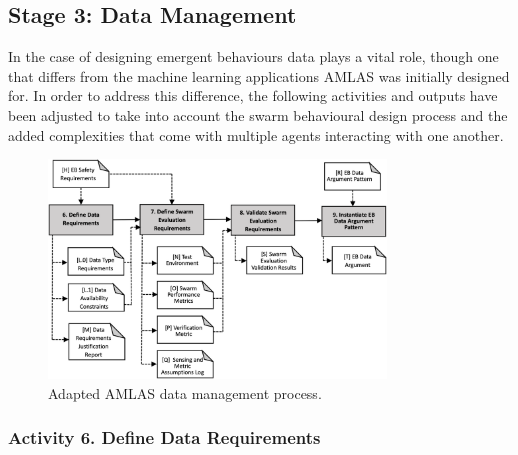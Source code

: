 \documentclass[lettersize,journal]{IEEEtran}
\begin{document}

\subsection{Stage 3: Data Management} \label{framework-stage3}

In the case of designing emergent behaviours data plays a vital role, though one that differs from the machine learning applications AMLAS was initially designed for. In order to address this difference, the following activities and outputs have been adjusted to take into account the swarm behavioural design process and the added complexities that come with multiple agents interacting with one another.

\begin{figure}
	\centering
	\includegraphics[width=0.8\textwidth]{figures/Stage3_DM_V2.png}
	\caption{Adapted AMLAS data management process.}
	\label{amlas-a-stage3}
\end{figure}

\subsubsection*{Activity 6. Define Data Requirements}
\end{document}
